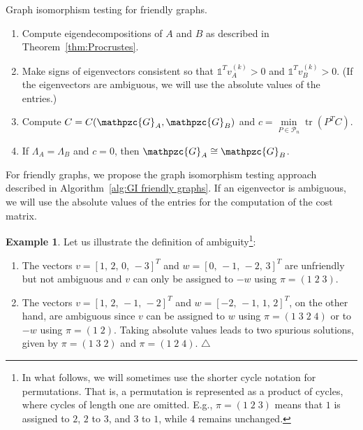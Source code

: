 \documentclass
[
    a4paper,
    DIV=11,
    abstracton
]
{scrartcl}
\newcommand{\mc}[1]{\mathpzc{#1}}
\newcommand\xqed[1]{\leavevmode\unskip\penalty9999 \hbox{}\nobreak\hfill \quad\hbox{#1}}
\newcommand{\exampleSymbol}{\xqed{$\triangle$}}
\DeclareMathOperator{\tr}{tr}
\theoremstyle{definition}
\newtheorem{example}[theorem]{Example}
\begin{document}
\begin{algorithm}[htb]
    \caption{Graph isomorphism testing for friendly graphs.}
    \label{alg:GI friendly graphs}
    \vspace*{-0.5\baselineskip}
    \begin{enumerate} \setlength{\itemsep}{0mm}
    \item Compute eigendecompositions of $ A $ and $ B $ as described in Theorem~\ref{thm:Procrustes}.
    \item Make signs of eigenvectors consistent so that $ \mathds{1}^T v_A^{(k)} > 0 $ and $ \mathds{1}^T v_B^{(k)} > 0$. (If the eigenvectors are ambiguous, we will use the absolute values of the entries.)
    \item Compute $ C = C(\mc{G}_A, \mc{G}_B) $ and $ c = \min\limits_{P \in \mathcal{P}_n} \tr \left( P^T C \right) $.
    \item If $ \Lambda_A = \Lambda_B $ and $ c = 0 $, then $ \mc{G}_A \cong \mc{G}_B $.
    \end{enumerate}
    \vspace*{-0.5\baselineskip}
\end{algorithm}

For friendly graphs, we propose the graph isomorphism testing approach described in Algorithm~\ref{alg:GI friendly graphs}. If an eigenvector is ambiguous, we will use the absolute values of the entries for the computation of the cost matrix.

\begin{example} \label{ex:Ambiguity}
Let us illustrate the definition of ambiguity\footnote{In what follows, we will sometimes use the shorter cycle notation for permutations. That is, a permutation is represented as a product of cycles, where cycles of length one are omitted. E.g., $ \pi = (1 \; 2 \; 3) $ means that $ 1 $ is assigned to $ 2 $, $ 2 $ to $ 3 $, and $ 3 $ to $ 1 $, while $ 4 $ remains unchanged.}:
\begin{enumerate}[label=\roman*)]
\item The vectors $ v = [1, \, 2, \, 0, \, -3]^T $ and $ w = [0, \, -1, \, -2, \, 3]^T $ are unfriendly but not ambiguous and $ v $ can only be assigned to $ -w $ using $ \pi = (1 \; 2 \; 3) $.
\item The vectors $ v = [1, \, 2, \, -1, \, -2]^T $ and $ w =[-2, \, -1, \, 1, \, 2]^T $, on the other hand, are ambiguous since $ v $ can be assigned to $ w $ using $ \pi = (1 \; 3 \; 2 \; 4) $ or to $ -w $ using $ \pi = (1 \; 2) $. Taking absolute values leads to two spurious solutions, given by $ \pi = (1 \; 3 \; 2) $ and $ \pi = (1 \; 2 \; 4) $. \exampleSymbol
\end{enumerate}
\end{example}
\end{document}
